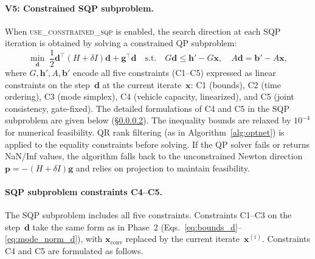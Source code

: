 \documentclass[11pt,a4paper]{article}
\newcommand{\xconv}{\mathbf{x}_{\mathrm{conv}}}
\begin{document}
\paragraph{V5: Constrained SQP subproblem.}
When \textsc{use\_constrained\_sqp} is enabled, the search direction at each SQP iteration is obtained by solving a constrained QP subproblem:
\begin{equation}
    \min_{\mathbf{d}} \; \frac{1}{2}\mathbf{d}^\top (H + \delta I) \mathbf{d} + \mathbf{g}^\top \mathbf{d}
    \quad\text{s.t.}\quad
    G\mathbf{d} \leq \mathbf{h}' - G\mathbf{x}, \quad
    A\mathbf{d} = \mathbf{b}' - A\mathbf{x},
    \label{eq:sqp_subqp}
\end{equation}
where $G, \mathbf{h}', A, \mathbf{b}'$ encode all five constraints (C1--C5) expressed as linear constraints on the step~$\mathbf{d}$ at the current iterate~$\mathbf{x}$:
C1 (bounds), C2 (time ordering), C3 (mode simplex), C4 (vehicle capacity, linearized), and C5 (joint consistency, gate-fixed).
The detailed formulations of C4 and C5 in the SQP subproblem are given below (\S\ref{par:sqp_c4c5}).
The inequality bounds are relaxed by $10^{-4}$ for numerical feasibility.
QR rank filtering (as in Algorithm~\ref{alg:optnet}) is applied to the equality constraints before solving.
If the QP solver fails or returns NaN/Inf values, the algorithm falls back to the unconstrained Newton direction $\mathbf{p} = -(H + \delta I)\mathbf{g}$ and relies on projection to maintain feasibility.

\paragraph{SQP subproblem constraints C4--C5.}
\label{par:sqp_c4c5}
The SQP subproblem includes all five constraints.
Constraints C1--C3 on the step~$\mathbf{d}$ take the same form as in Phase~2 (Eqs.~\ref{eq:bounds_d}--\ref{eq:mode_norm_d}), with $\xconv$ replaced by the current iterate~$\mathbf{x}^{(i)}$.
Constraints C4 and C5 are formulated as follows.
\end{document}
